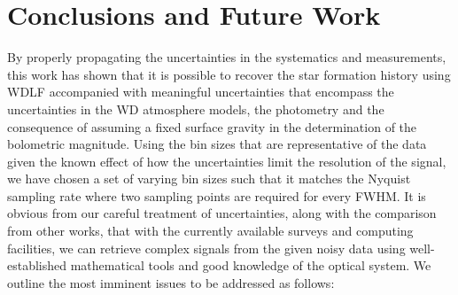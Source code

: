 \documentclass[fleqn,usenatbib]{mnras}
\begin{document}
\section{Conclusions and Future Work}
\label{sec:conclusion}
By properly propagating the uncertainties in the systematics and measurements,
this work has shown that it is possible to recover the star formation history 
using WDLF accompanied with meaningful uncertainties that encompass the 
uncertainties in the WD atmosphere models, the photometry and the consequence
of assuming a fixed surface gravity in the determination of the bolometric 
magnitude. Using the bin sizes that are representative of the data given the
known effect of how the uncertainties limit the resolution of the signal, we
have chosen a set of varying bin sizes such that it matches the Nyquist
sampling rate where two sampling points are required for every FWHM. It is 
obvious from our careful treatment of uncertainties, along with the comparison 
from other works, that with the currently available surveys and computing
facilities, we can retrieve complex signals from the given noisy data using
well-established mathematical tools and good knowledge of the optical system.
We outline the most imminent issues to be addressed as follows:
\end{document}
